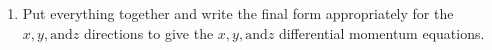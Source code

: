 \documentclass[../main.tex]{subfiles}
\begin{document}
\begin{enumerate}[label = (\alph*)]
\begin{enumerate}[label = (b\arabic*)]
        \item
            Put everything together and write the final form appropriately for the $x, y, \textrm{and} z$ directions to give the $x, y, \textrm{and} z$ differential momentum equations. 
        
    \end{enumerate}
    
\end{enumerate}
\end{document}
